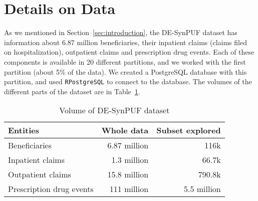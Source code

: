 \section{Details on Data}
\label{sec:data}
As we mentioned in Section~\ref{sec:introduction}, the DE-SynPUF dataset \cite{desynpuf} has information about 6.87 million beneficiaries, their inpatient claims (claims filed on hospitalization), outpatient claims and prescription drug events. Each of these components is available in 20 different partitions, and we worked with the first partition (about 5\% of the data). We created a PostgreSQL \cite{postgresql} database with this partition, and used \texttt{RPostgreSQL} \cite{rpostgresql} to connect to the database. The volumes of the different parts of the dataset are in Table~\ref{tab:desynpuf_data}.\\

\begin{table}[ht]
\caption{Volume of DE-SynPUF dataset}
\begin{tabular}{lrr}
\hline
Entities & Whole data & Subset explored\\
\hline
Beneficiaries & 6.87 million & 116k\\
Inpatient claims & 1.3 million & 66.7k\\
Outpatient claims & 15.8 million & 790.8k\\
Prescription drug events & 111 million & 5.5 million\\
\hline
\end{tabular}
\label{tab:desynpuf_data}
\end{table}

